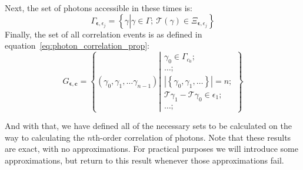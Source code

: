 \documentclass{article}
\newcommand{\braces}[1]{\ensuremath{\left\lbrace #1 \right\rbrace}}
\newcommand{\parens}[1]{\ensuremath{\left( #1 \right)}}
\newcommand{\setbuilder}[2]{\ensuremath{\braces{#1 \left| #2 \right.}}}
\renewcommand{\vec}{\boldsymbol}
\newcommand{\abs}[1]{\ensuremath{\left|#1\right|}}
\newcommand{\channel}{\ensuremath{c}}
\newcommand{\Time}{\ensuremath{\mathcal{T}}}
\newcommand{\photon}{\ensuremath{\gamma}}
\newcommand{\photons}{\ensuremath{\Gamma}}
\newcommand{\integrationtime}{\ensuremath{\Xi}}
\newcommand{\resolution}{\ensuremath{\epsilon}}
\newcommand{\correlationset}{\ensuremath{G}}
\newcommand{\nth}{\ensuremath{n}\textnormal{th}}
\begin{document}
Next, the set of photons accessible in these times is:
\begin{equation}
\photons_{\vec{\resolution}, \resolution_{j}} = 
   \setbuilder{\photon}
              {\photon\in\photons;~
               \Time\parens{\photon}\in\integrationtime_{\vec{\resolution},\resolution_{j}}}
\end{equation}
Finally, the set of all correlation events is as defined in equation~\ref{eq:photon_correlation_prop}:
\begin{equation}
\label{eq:correlation_set}
\correlationset_{\vec{\resolution},\vec{\channel}} =
    \setbuilder{\parens{\photon_{0},\photon_{1},\ldots\photon_{n-1}}}
               {\begin{aligned}
                \photon_{0}\in\photons_{\channel_{0}};\\
                \ldots;\\
                \abs{\braces{\photon_{0},\photon_{1},\ldots}} = n;\\
                \Time{\photon_{1}}-\Time{\photon_{0}}\in\resolution_{1};\\
                \ldots;
                \end{aligned}}
\end{equation}

And with that, we have defined all of the necessary sets to be calculated on the way to calculating the \nth-order correlation of photons. Note that these results are exact, with no approximations. For practical purposes we will introduce some approximations, but return to this result whenever those approximations fail.
\end{document}
